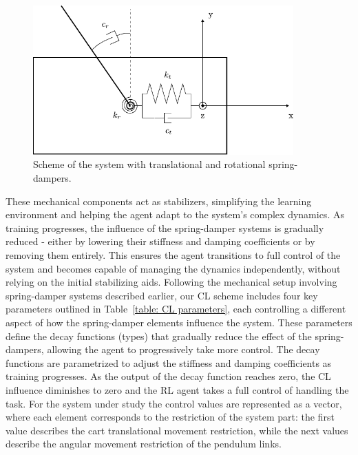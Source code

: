 \begin{figure}[h]
	\centering
	\includegraphics[width=10cm]{Figures/cl_mech_implementation_v1.pdf}
	\caption{Scheme of the system with translational and rotational spring-dampers. }
	\label{fig: cl mechanical implementation}
\end{figure}

These mechanical components act as stabilizers, simplifying the learning environment and helping the agent adapt to the system's complex dynamics. As training progresses, the influence of the spring-damper systems is gradually reduced - either by lowering their stiffness and damping coefficients or by removing them entirely. This ensures the agent transitions to full control of the system and becomes capable of managing the dynamics independently, without relying on the initial stabilizing aids. 
Following the mechanical setup involving spring-damper systems described earlier, our CL scheme includes four key parameters outlined in Table~\ref{table: CL parameters}, each controlling a different aspect of how the spring-damper elements influence the system. These parameters define the decay functions (types) that gradually reduce the effect of the spring-dampers, allowing the agent to progressively take more control. The decay functions are parametrized to adjust the stiffness and damping coefficients as training progresses. As the output of the decay function reaches zero, the CL influence diminishes to zero and the RL agent takes a full control of handling the task. For the system under study the control values are represented as a vector, where each element corresponds to the restriction of the system part: the first value describes the cart translational movement restriction, while the next values describe the angular movement restriction of the pendulum links. 

